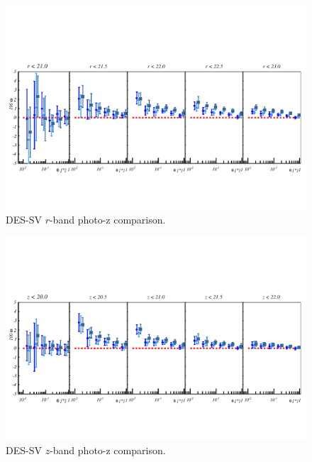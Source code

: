\begin{figure}
\includegraphics[width=\textwidth,trim={0 2.3cm 0 3.5cm},clip]{./figures_appendix/mag_r_photoz_comparison.pdf}
\caption{DES-SV $r$-band photo-z comparison.}
\end{figure}

\begin{figure}
\includegraphics[width=\textwidth,trim={0 2.3cm 0 3.5cm},clip]{./figures_appendix/mag_z_photoz_comparison.pdf}
\caption{DES-SV $z$-band photo-z comparison.}
\end{figure}


